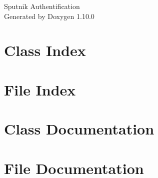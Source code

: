 \documentclass[twoside]{book}
\newcommand{\+}{\discretionary{\mbox{\scriptsize$\hookleftarrow$}}{}{}}
\newcommand{\clearemptydoublepage}{%
    \newpage{\pagestyle{empty}\cleardoublepage}%
  }
\begin{document}
  \raggedbottom
    \hypersetup{pageanchor=false,
                bookmarksnumbered=true,
                pdfencoding=unicode
               }
  \begin{titlepage}
  \vspace*{7cm}
  \begin{center}%
  {\Large Sputnik Authentification}\\
  \vspace*{1cm}
  {\large Generated by Doxygen 1.10.0}\\
  \end{center}
  \end{titlepage}
  \clearemptydoublepage
  \tableofcontents
  \clearemptydoublepage
  \hypersetup{pageanchor=true}
\chapter{Class Index}

\chapter{File Index}

\chapter{Class Documentation}












\chapter{File Documentation}




























  \backmatter
  \newpage
  \clearemptydoublepage
  \printindex
\end{document}
